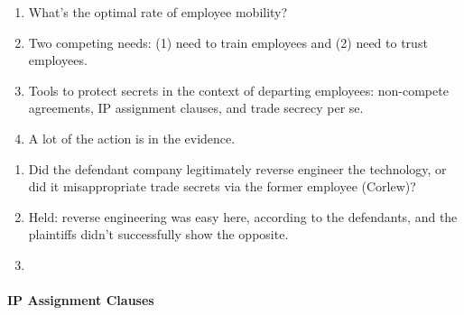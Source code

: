 \begin{enumerate}
    \item What's the optimal rate of employee mobility?
    \item Two competing needs: (1) need to train employees and (2) need to 
    trust employees.
    \item Tools to protect secrets in the context of departing employees: 
    non-compete agreements, IP assignment clauses, and trade secrecy per se.
    \item A lot of the action is in the evidence.
\end{enumerate}


\begin{enumerate}
    \item Did the defendant company legitimately reverse engineer the 
    technology, or did it misappropriate trade secrets via the former 
    employee (Corlew)?
    \item Held: reverse engineering was easy here, according to the 
    defendants, and the plaintiffs didn't successfully show the opposite.  
    \item 
\end{enumerate}

\paragraph{IP Assignment Clauses}

